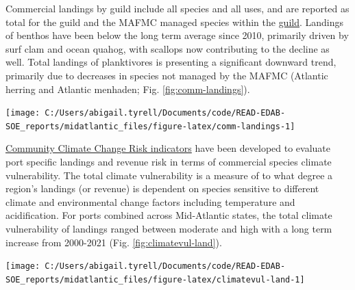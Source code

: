 \documentclass[
  10pt,
]{article}
\let\origfigure\figure
\let\endorigfigure\endfigure
\renewenvironment{figure}[1][2] {
    \expandafter\origfigure\expandafter[H]
} {
    \endorigfigure
}
\begin{document}
Commercial landings by guild include all species and all uses, and are reported as total for the guild and the MAFMC managed species within the \href{https://noaa-edab.github.io/catalog/species_groupings.html}{guild}. Landings of benthos have been below the long term average since 2010, primarily driven by surf clam and ocean quahog, with scallops now contributing to the decline as well. Total landings of planktivores is presenting a significant downward trend, primarily due to decreases in species not managed by the MAFMC (Atlantic herring and Atlantic menhaden; Fig. \ref{fig:comm-landings}).

\begin{figure}

{\centering \texttt{[image: C:/Users/abigail.tyrell/Documents/code/READ-EDAB-SOE\_reports/midatlantic\_files/figure-latex/comm-landings-1]} 

}

\caption{Total commercial landings in the Mid-Atlantic Bight (black) and MAFMC-managed U.S seafood landings (red) by feeding guild, with significant declines (purple) in total planktivore landings.}\label{fig:comm-landings}
\end{figure}

\href{https://noaa-edab.github.io/catalog/community_climate_vulnerability.html}{Community Climate Change Risk indicators} have been developed to evaluate port specific landings and revenue risk in terms of commercial species climate vulnerability. The total climate vulnerability is a measure of to what degree a region's landings (or revenue) is dependent on species sensitive to different climate and environmental change factors including temperature and acidification. For ports combined across Mid-Atlantic states, the total climate vulnerability of landings ranged between moderate and high with a long term increase from 2000-2021 (Fig. \ref{fig:climatevul-land}).

\begin{figure}

{\centering \texttt{[image: C:/Users/abigail.tyrell/Documents/code/READ-EDAB-SOE\_reports/midatlantic\_files/figure-latex/climatevul-land-1]} 

}

\caption{Mid-Atlantic region total climate vulnerability of commercial landings (sum of Mid-Atlantic port landings weighted by species climate vulnerability from Hare et al. 2016).}\label{fig:climatevul-land}
\end{figure}
\end{document}
